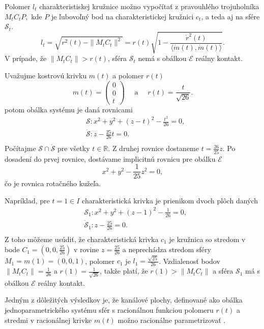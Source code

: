 Polomer $l_t$ charakteristiskej kružnice  možno vypočítať z pravouhlého trojuholníka $M_tC_tP,$ kde $P$ je ľubovoľný bod na charakteristickej kružnici $c_t$, a teda aj na sfére $\mathcal{S}_t.$
$$ l_t = \sqrt{r^2(t) - \|M_tC_t\|^2} = r(t) \sqrt{ 1 - \frac{\dot{r}^2(t)}{\langle \dot{m}(t), \dot{m}(t) \rangle}}. $$
V prípade, že $ \|M_tC_t\| > r(t)$, sféra $\mathcal{S}_t$ nemá s obálkou $\mathcal{E}$ reálny kontakt. 

\begin{example}
Uvažujme kostrovú krivku $m(t)$ a polomer $r(t)$
$$ 
m(t) = \begin{pmatrix} 0 \\ 0 \\ t \end{pmatrix} \quad \text{ a } \quad r(t) = \frac{t}{\sqrt{26}}.
$$
potom obálka systému je daná rovnicami
\begin{align*}
&\mathcal{S} \colon x^2 + y^2 + (z - t)^2 - \frac{t^2}{26} = 0, \\
&\mathcal{\dot{S}} \colon z - \frac{25}{26}t = 0. \\
\end{align*}
Počítajme $ \mathcal{S} \cap \mathcal{\dot{S}} $ pre všetky $t \in \mathbb{R}.$ Z druhej rovnice dostaneme $t = \frac{26}{25}z$. Po dosadení do prvej rovnice, dostávame implicitnú rovnicu pre obálku $\mathcal{E}$
$$
x^2 + y^2 - \frac{1}{25}z^2 = 0,
$$
čo je rovnica rotačného kužeľa.

Napríklad, pre $t = 1 \in I$ charakteristická krivka je prienikom dvoch plôch daných
\begin{align*}
&\mathcal{S}_1 \colon x^2 + y^2 + (z - 1)^2 - \frac{1}{26} = 0, \\
&\mathcal{\dot{S}}_1 \colon z - \frac{25}{26} = 0. \\
\end{align*}
Z toho môžeme usúdiť, že charakteristická krivka $c_1$ je kružnica so stredom v bode $C_1 = (0, 0, \frac{25}{26})$ v rovine $z = \frac{25}{26}$ a neprechádza stredom sféry $M_1 = m(1) = (0,0,1)$, polomer $c_1$ je $l_{1} = \frac{\sqrt{25}}{26}$. Vzdialenosť bodov $ \|M_tC_t\| = \frac{1}{26}$ a $r(1)= \frac{1}{\sqrt{26}}$, takže platí, že $r(1) > \|M_tC_t\|$ a sféra $\mathcal{S}_1$ má s obálkou $\mathcal{E}$ reálny kontakt.
\end{example}

Jedným z dôležitých výsledkov je, že kanálové plochy, definované ako obálka jednoparametrického systému sfér s racionálnou funkciou polomeru $r(t)$ a stredmi v racionálnej krivke $m(t)$ možno racionálne parametrizovať \cite{Pet97}.

